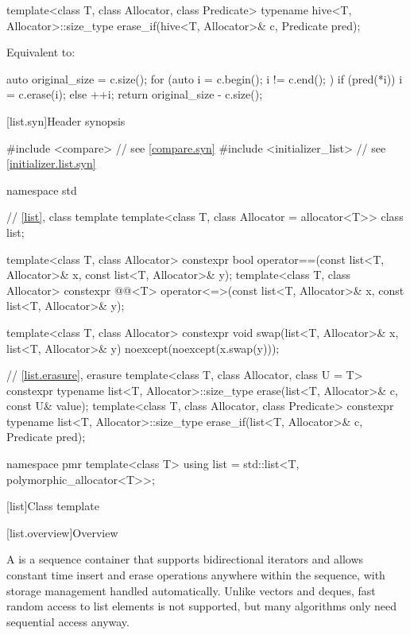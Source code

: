 %
\begin{itemdecl}
template<class T, class Allocator, class Predicate>
  typename hive<T, Allocator>::size_type
    erase_if(hive<T, Allocator>& c, Predicate pred);
\end{itemdecl}

\begin{itemdescr}
\pnum
\effects
Equivalent to:
\begin{codeblock}
auto original_size = c.size();
for (auto i = c.begin(); i != c.end(); ) {
  if (pred(*i)) {
    i = c.erase(i);
  } else {
    ++i;
  }
}
return original_size - c.size();
\end{codeblock}
\end{itemdescr}

[list.syn]{Header  synopsis}

%
\begin{codeblock}
#include <compare>              // see \ref{compare.syn}
#include <initializer_list>     // see \ref{initializer.list.syn}

namespace std {
  // \ref{list}, class template 
  template<class T, class Allocator = allocator<T>> class list;

  template<class T, class Allocator>
    constexpr bool operator==(const list<T, Allocator>& x, const list<T, Allocator>& y);
  template<class T, class Allocator>
    constexpr @@<T>
      operator<=>(const list<T, Allocator>& x, const list<T, Allocator>& y);

  template<class T, class Allocator>
    constexpr void swap(list<T, Allocator>& x, list<T, Allocator>& y)
      noexcept(noexcept(x.swap(y)));

  // \ref{list.erasure}, erasure
  template<class T, class Allocator, class U = T>
    constexpr typename list<T, Allocator>::size_type
      erase(list<T, Allocator>& c, const U& value);
  template<class T, class Allocator, class Predicate>
    constexpr typename list<T, Allocator>::size_type
      erase_if(list<T, Allocator>& c, Predicate pred);

  namespace pmr {
    template<class T>
      using list = std::list<T, polymorphic_allocator<T>>;
  }
}
\end{codeblock}

[list]{Class template }

[list.overview]{Overview}

\pnum
{}%
A
is a sequence container that supports
bidirectional iterators and allows constant time insert and erase
operations anywhere within the sequence, with storage management handled
automatically. Unlike vectors and deques,
fast random access to list elements is not supported, but many
algorithms only need sequential access anyway.

